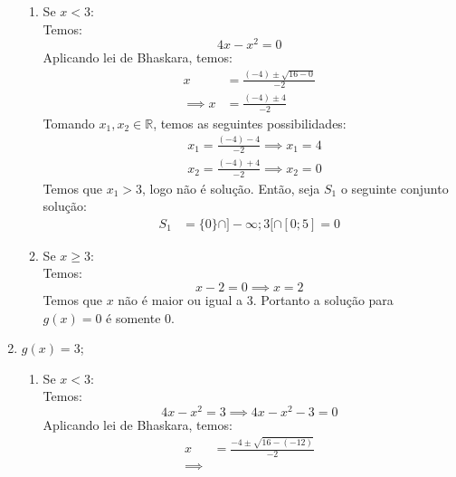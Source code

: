 \begin{enumerate}
\begin{enumerate}
                \item Se $x < 3$: \\
                    Temos:
                    \begin{displaymath}
                        4x - x^2 = 0
                    \end{displaymath}
                    Aplicando lei de Bhaskara, temos:
                    \begin{align*}
                        x &= \frac{(-4) \pm \sqrt{16 - 0}}{-2} \\ \implies
                        x &= \frac{(-4) \pm 4}{-2}
                    \end{align*}
                    Tomando $x_1, x_2 \in \mathbb{R}$, temos as seguintes possibilidades:
                    \begin{align*}
                        &x_1 = \frac{(-4) - 4}{-2} \implies x_1 = 4 \\  
                        &x_2 = \frac{(-4) + 4}{-2} \implies x_2 = 0
                    \end{align*}
                    Temos que $x_1 > 3$, logo não é solução. Então, seja $S_1$ o seguinte conjunto solução:
                    \begin{align*}
                        S_1 &= \{0\} \cap ]-\infty; 3[ \cap  [0; 5] = 0
                    \end{align*}
                \item Se $x \ge 3$: \\
                    Temos: 
                    \begin{displaymath}
                        x - 2 = 0 \implies x = 2
                    \end{displaymath}
                    Temos que $x$ não é maior ou igual a 3. Portanto a solução para $g(x) = 0$ é somente 0.
            \end{enumerate}
        \item $g(x) = 3$;
            \begin{enumerate}
            \item Se $x < 3$: \\
                Temos:
                \begin{displaymath}
                    4x - x^2 = 3 \implies 4x - x^2 - 3 = 0 
                \end{displaymath}
                Aplicando lei de Bhaskara, temos:
                \begin{align*}
                    x &= \frac{-4 \pm \sqrt{16 - (-12)}}{-2} \\ \implies

\end{align*}
\end{enumerate}
\end{enumerate}
